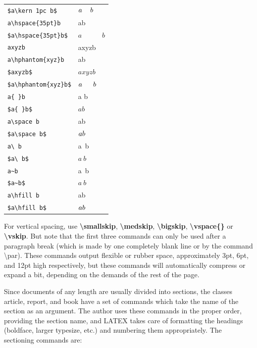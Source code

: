 \documentclass[a4paper,11pt,UTF8,openright]{book}
\begin{document}
\begin{center}
\begin{longtable}{p{}p{}}
  \verb|$a\kern 1pc b$|          & $a\kern 1pc b$ \\
  \verb|a\hspace{35pt}b|         & a\hspace{35pt}b \\
  \verb|$a\hspace{35pt}b$|       & $a\hspace{35pt}b$ \\
  \verb|axyzb|                   & axyzb \\
  \verb|a\hphantom{xyz}b|        & a\hphantom{xyz}b \\
  \verb|$axyzb$|                 & $axyzb$ \\
  \verb|$a\hphantom{xyz}b$|      & $a\hphantom{xyz}b$ \\
  \verb|a{ }b|                   & a{ }b \\
  \verb|$a{ }b$|                 & $a{ }b$ \\
  \verb|a\space b|               & a\space b \\
  \verb|$a\space b$|             & $a\space b$ \\
  \verb|a\ b|                    & a\ b \\
  \verb|$a\ b$|                  & $a\ b$ \\
  \verb|a~b|                     & a~b \\
  \verb|$a~b$|                   & $a~b$ \\
  \verb|a\hfill b|               & a\hfill b \\
  \verb|$a\hfill b$|             & $a\hfill b$ \\
\end{longtable}
\end{center}

For vertical spacing, use \textbf{\textbackslash smallskip}, \textbf{\textbackslash medskip}, \textbf{\textbackslash bigskip}, \textbf{\textbackslash vspace\{\}} or \textbf{\textbackslash vskip}. But note that the first three commands can only be used after a paragraph break (which is made by one completely blank line or by the command \textbackslash par). These commands output flexible or rubber space, approximately 3pt, 6pt, and 12pt high respectively, but these commands will automatically compress or expand a bit, depending on the demands of the rest of the page.

Since documents of any length are usually divided into sections, the classes article, report, and book have a set of commands which take the name of the section as an argument. The author uses these commands in the proper order, providing the section name, and LATEX takes care of formatting the headings (boldface, larger typesize, etc.) and numbering them appropriately. The sectioning commands are:
\end{document}
